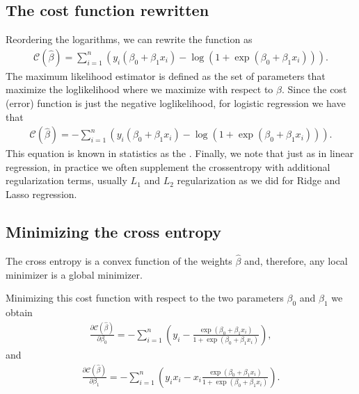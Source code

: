 \documentclass[letterpaper,10pt,english]{sphinxmanual}
\begin{document}
\subsection{The cost function rewritten}
\label{\detokenize{chapter5:the-cost-function-rewritten}}
Reordering the logarithms, we can rewrite the  function as
\begin{equation*}
\begin{split}
\mathcal{C}(\hat{\beta}) = \sum_{i=1}^n  \left(y_i(\beta_0+\beta_1x_i) -\log{(1+\exp{(\beta_0+\beta_1x_i)})}\right).
\end{split}
\end{equation*}
The maximum likelihood estimator is defined as the set of parameters that maximize the log\sphinxhyphen{}likelihood where we maximize with respect to \(\beta\).
Since the cost (error) function is just the negative log\sphinxhyphen{}likelihood, for logistic regression we have that
\begin{equation*}
\begin{split}
\mathcal{C}(\hat{\beta})=-\sum_{i=1}^n  \left(y_i(\beta_0+\beta_1x_i) -\log{(1+\exp{(\beta_0+\beta_1x_i)})}\right).
\end{split}
\end{equation*}
This equation is known in statistics as the . Finally, we note that just as in linear regression,
in practice we often supplement the cross\sphinxhyphen{}entropy with additional regularization terms, usually \(L_1\) and \(L_2\) regularization as we did for Ridge and Lasso regression.


\subsection{Minimizing the cross entropy}
\label{\detokenize{chapter5:minimizing-the-cross-entropy}}
The cross entropy is a convex function of the weights \(\hat{\beta}\) and,
therefore, any local minimizer is a global minimizer.

Minimizing this
cost function with respect to the two parameters \(\beta_0\) and \(\beta_1\) we obtain
\begin{equation*}
\begin{split}
\frac{\partial \mathcal{C}(\hat{\beta})}{\partial \beta_0} = -\sum_{i=1}^n  \left(y_i -\frac{\exp{(\beta_0+\beta_1x_i)}}{1+\exp{(\beta_0+\beta_1x_i)}}\right),
\end{split}
\end{equation*}
and
\begin{equation*}
\begin{split}
\frac{\partial \mathcal{C}(\hat{\beta})}{\partial \beta_1} = -\sum_{i=1}^n  \left(y_ix_i -x_i\frac{\exp{(\beta_0+\beta_1x_i)}}{1+\exp{(\beta_0+\beta_1x_i)}}\right).
\end{split}
\end{equation*}
\end{document}
